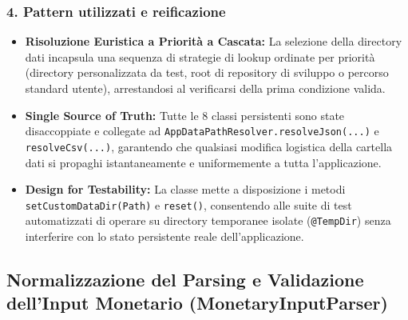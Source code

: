\documentclass[11pt,a4paper,openright]{report}
\begin{document}
\subsubsection*{4. Pattern utilizzati e reificazione}
\begin{itemize}
  \item \textbf{Risoluzione Euristica a Priorità a Cascata:} La selezione della directory dati incapsula una sequenza di strategie di lookup ordinate per priorità (directory personalizzata da test, root di repository di sviluppo o percorso standard utente), arrestandosi al verificarsi della prima condizione valida.
  \item \textbf{Single Source of Truth:} Tutte le 8 classi persistenti sono state disaccoppiate e collegate ad \texttt{AppDataPathResolver.resolveJson(...)} e \texttt{resolveCsv(...)}, garantendo che qualsiasi modifica logistica della cartella dati si propaghi istantaneamente e uniformemente a tutta l'applicazione.
  \item \textbf{Design for Testability:} La classe mette a disposizione i metodi \texttt{setCustomDataDir(Path)} e \texttt{reset()}, consentendo alle suite di test automatizzati di operare su directory temporanee isolate (\texttt{@TempDir}) senza interferire con lo stato persistente reale dell'applicazione.
\end{itemize}

\subsection{Normalizzazione del Parsing e Validazione dell'Input Monetario (MonetaryInputParser)}
\end{document}
